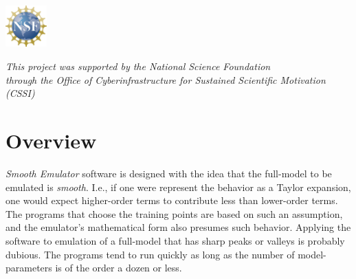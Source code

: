 \documentclass[12pt]{article}
\numberwithin{equation}{section}
\numberwithin{figure}{section}
\begin{document}
\begin{titlepage}
       
       
       \vspace*{-1.75cm}
       \hspace*{12.5cm}
       \includegraphics[width=0.12\textwidth]{figs/nsf_logo.png}

       

\begin{center}
{\it This project was supported by the National Science Foundation\\ through the Office of Cyberinfrastructure for Sustained Scientific Motivation (CSSI)}
\end{center}

\end{titlepage}

\newpage

\thispagestyle{empty}

\tableofcontents

\newpage

\thispagestyle{empty}

\section{Overview}\label{sec:overview}

{\it Smooth Emulator} software is designed with the idea that the full-model to be emulated is {\it smooth}. I.e., if one were represent the behavior as a Taylor expansion, one would expect higher-order terms to contribute less than lower-order terms. The programs that choose the training points are based on such an assumption, and the emulator's mathematical form also presumes such behavior. Applying the software to emulation of a full-model that has sharp peaks or valleys is probably dubious. The programs tend to run quickly as long as the number of model-parameters is of the order a dozen or less.
\end{document}
